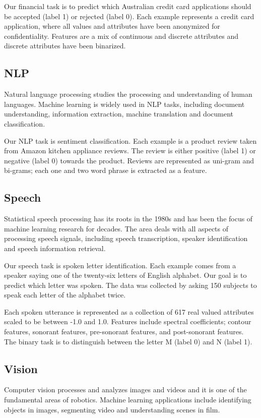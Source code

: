 \documentclass[11pt]{article}
\begin{document}
	Our financial task is to predict which Australian credit card applications should be accepted (label 1) or rejected (label 0). Each example represents a credit card application, where all values and attributes have been anonymized for confidentiality. Features are a mix of continuous and discrete attributes and discrete attributes have been binarized.
	
	\subsection{NLP}
	Natural language processing studies the processing and understanding of human languages. Machine learning is widely used in NLP tasks, including document understanding, information extraction, machine translation and document classification.
	
	Our NLP task is sentiment classification. Each example is a product review taken from Amazon kitchen appliance reviews. The review is either positive (label 1) or negative (label 0) towards the product. Reviews are represented as uni-gram and bi-grams; each one and two word phrase is extracted as a feature.
	
	\subsection{Speech}
	Statistical speech processing has its roots in the 1980s and has been the focus of machine learning research for decades. The area deals with all aspects of processing speech signals, including speech transcription, speaker identification and speech information retrieval.
	
	Our speech task is spoken letter identification. Each example comes from a speaker saying one of the twenty-six letters of English alphabet. Our goal is to predict which letter was spoken. The data was collected by asking 150 subjects to speak each letter of the alphabet twice.
	
	Each spoken utterance is represented as a collection of 617 real valued attributes scaled to be between -1.0 and 1.0. Features include spectral coefficients; contour features, sonorant features, pre-sonorant features, and post-sonorant features. The binary task is to distinguish between the letter M (label 0) and N (label 1).
	
	\subsection{Vision}
	Computer vision processes and analyzes images and videos and it is one of the fundamental areas of robotics. Machine learning applications include identifying objects in images, segmenting video and understanding scenes in film.
	
\end{document}
